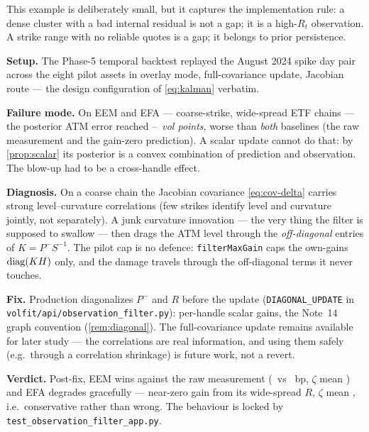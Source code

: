 \documentclass[11pt]{article}
\begin{document}
This example is deliberately small, but it captures the implementation rule: a
dense cluster with a bad internal residual is not a gap; it is a high-$R_t$
observation. A strike range with no reliable quotes is a gap; it belongs to
prior persistence.

\begin{example}[title={Case file: the off-diagonal blow-up on coarse chains}]
\textbf{Setup.} The Phase-5 temporal backtest replayed the August 2024 spike
day pair across the eight pilot assets in overlay mode, full-covariance
update, Jacobian route --- the design configuration of \cref{eq:kalman}
verbatim.

\textbf{Failure mode.} On EEM and EFA --- coarse-strike, wide-spread ETF
chains --- the posterior ATM error reached
\KalBlowupMinPts--\KalBlowupMaxPts\ \emph{vol points}, worse than \emph{both}
baselines (the raw measurement and the gain-zero prediction). A scalar update
cannot do that: by \cref{prop:scalar} its posterior is a convex combination of
prediction and observation. The blow-up had to be a cross-handle effect.

\textbf{Diagnosis.} On a coarse chain the Jacobian covariance
\cref{eq:cov-delta} carries strong level--curvature correlations (few strikes
identify level and curvature jointly, not separately). A junk curvature
innovation --- the very thing the filter is supposed to swallow --- then drags
the ATM level through the \emph{off-diagonal} entries of
$K=P^-S^{-1}$. The pilot cap is no defence: \texttt{filterMaxGain} caps the
own-gains $\operatorname{diag}(KH)$ only, and the damage travels through the off-diagonal
terms it never touches.

\textbf{Fix.} Production diagonalizes $P^-$ and $R$ before the update
(\texttt{DIAGONAL\_UPDATE} in \texttt{volfit/api/observation\_filter.py}):
per-handle scalar gains, the Note~14 graph convention
(\cref{rem:diagonal}). The full-covariance update remains available for later
study --- the correlations are real information, and using them safely (e.g.\
through a correlation shrinkage) is future work, not a revert.

\textbf{Verdict.} Post-fix, EEM wins against the raw measurement
(\KalEEMPost\ vs \KalEEMMeas\ bp, $\zeta$ mean \KalEEMZeta) and EFA degrades
gracefully --- near-zero gain from its wide-spread $R$, $\zeta$ mean
\KalEFAZeta, i.e.\ conservative rather than wrong. The behaviour is locked by
\texttt{test\_observation\_filter\_app.py}.
\end{example}

\end{document}

